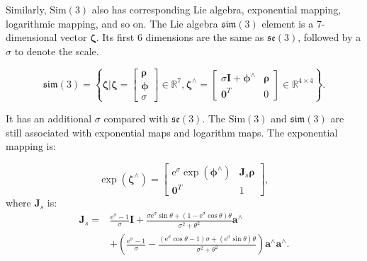 Similarly, $\mathrm{Sim}(3)$ also has corresponding Lie algebra, exponential mapping, logarithmic mapping, and so on. The Lie algebra $\mathfrak{sim}(3)$ element is a 7-dimensional vector $\boldsymbol{\zeta}$. Its first 6 dimensions are the same as $\mathfrak{se}(3)$, followed by a $\sigma$ to denote the scale.

\begin{equation}
\mathfrak{sim} \left( 3 \right) = \left\{ { \boldsymbol{\zeta} | \boldsymbol{\zeta} = \left[ \begin{array}{l}
    \boldsymbol{\rho} \\
    \boldsymbol{\phi} \\
    \sigma
    \end{array} \right] \in { \mathbb{R}^7},{ \boldsymbol{\zeta} ^ \wedge } = \left[ {\begin{array}{*{20}{c}}
        {\sigma \mathbf{I} + {\boldsymbol{\phi} ^ \wedge }}&\boldsymbol{\rho} \\
        {{\mathbf{0}^T}}&0
        \end{array}} \right] \in {\mathbb{R}^{4 \times 4}}} \right\}.
\end{equation}

It has an additional $\sigma$ compared with $\mathfrak{se}(3)$. The $\mathrm{Sim}(3)$ and $\mathfrak{sim}(3)$ are still associated with exponential maps and logarithm maps. The exponential mapping is:

\begin{equation}
\exp \left( {{ \boldsymbol{\zeta} ^ \wedge }} \right) = \left[ {\begin{array}{*{20}{c}}
    {{\mathrm{e}^\sigma }\exp \left( {{ \boldsymbol{\phi} ^ \wedge }} \right)}&{ \mathbf{J}_s \boldsymbol{\rho} }\\
    {{\mathbf{0}^T}}&1
    \end{array}} \right],
\end{equation}
where $\mathbf{J}_s$ is:
\begin{align*}
{ \mathbf{J}_s} =& \frac{{{\mathrm{e}^\sigma } - 1}}{\sigma } \mathbf{I} + \frac{ \sigma {{\mathrm{e} ^\sigma }\sin \theta + \left( {1 - {\mathrm{e}^\sigma }\cos \theta } \right)\theta }}{{{\sigma ^2} + {\theta ^ 2}}}{\mathbf{a}^ \wedge }\\
&+ \left( {\frac{{{\mathrm{e}^\sigma } - 1}}{\sigma } - \frac{{\left( {{\mathrm{e}^\sigma }\cos \theta - 1} \right)\sigma + ({\mathrm{e}^\sigma }\sin \theta )\theta }}{{{\sigma ^2} + {\theta ^2}}}} \right ){\mathbf{a}^ \wedge }{\mathbf{a}^ \wedge }.
\end{align*}

